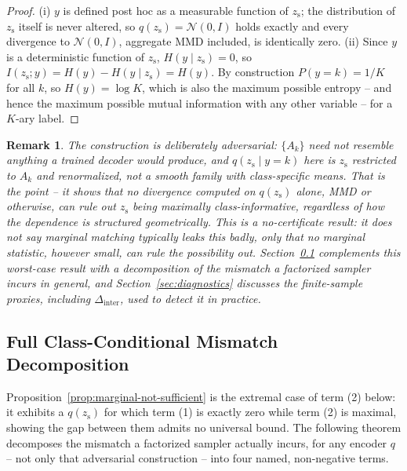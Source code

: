 \documentclass[10pt,letterpaper]{article}
\newcommand{\zs}{z_{\mathrm{s}}}
\newtheorem{remark}{Remark}
\begin{document}
\begin{proof}
(i) $y$ is defined post hoc as a measurable function of $\zs$; the
distribution of $\zs$ itself is never altered, so $q(\zs)=\mathcal N(0,I)$
holds exactly and every divergence to $\mathcal N(0,I)$, aggregate MMD
included, is identically zero. (ii) Since $y$ is a deterministic function of
$\zs$, $H(y\mid\zs)=0$, so $I(\zs;y)=H(y)-H(y\mid\zs)=H(y)$. By construction
$P(y=k)=1/K$ for all $k$, so $H(y)=\log K$, which is also the maximum
possible entropy -- and hence the maximum possible mutual information with
any other variable -- for a $K$-ary label.
\end{proof}

\begin{remark}
The construction is deliberately adversarial: $\{A_k\}$ need not resemble
anything a trained decoder would produce, and $q(\zs\mid y{=}k)$ here is
$\zs$ restricted to $A_k$ and renormalized, not a smooth family with
class-specific means. That is the point -- it shows that \emph{no}
divergence computed on $q(\zs)$ alone, MMD or otherwise, can rule out $\zs$
being maximally class-informative, regardless of how the dependence is
structured geometrically. This is a \emph{no-certificate} result: it does
not say marginal matching typically leaks this badly, only that no marginal
statistic, however small, can rule the possibility out.
Section~\ref{sec:decomposition} complements this worst-case result with a
decomposition of the mismatch a factorized sampler incurs in general, and
Section~\ref{sec:diagnostics} discusses the finite-sample proxies,
including $\Delta_{\mathrm{inter}}$, used to detect it in practice.
\end{remark}

\subsection{Full Class-Conditional Mismatch Decomposition}
\label{sec:decomposition}

Proposition~\ref{prop:marginal-not-sufficient} is the extremal case of
term (2) below: it exhibits a $q(\zs)$ for which term (1) is exactly zero
while term (2) is maximal, showing the gap between them admits no universal
bound. The following theorem decomposes the mismatch a factorized sampler
actually incurs, for any encoder $q$ -- not only that adversarial
construction -- into four named, non-negative terms.
\end{document}
